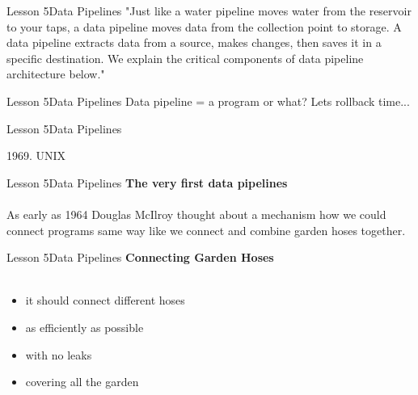 \documentclass[aspectratio=1610]{beamer}
\begin{document}
\begin{frame}{Lesson 5}{Data Pipelines}
\LARGE
"Just like a water pipeline moves water from the reservoir to your
taps, a data pipeline moves data from the collection point to
storage. A data pipeline extracts data from a source, makes changes,
then saves it in a specific destination. We explain the critical
components of data pipeline architecture below."
\end{frame}


\begin{frame}
\end{frame}


\begin{frame}{Lesson 5}{Data Pipelines}
\Huge
 Data pipeline = a program or what? Lets rollback time... 
 \end{frame}


\begin{frame}{Lesson 5}{Data Pipelines}
\Huge
\begin{center}
1969. UNIX 
\end{center}
\end{frame}

\begin{frame}{Lesson 5}{Data Pipelines}
\LARGE
\textbf{The very first data pipelines}\\~\\
As early as 1964 Douglas McIlroy thought about a mechanism how we 
could connect programs same way like we connect and combine
garden hoses together. 
\end{frame}


\begin{frame}
\end{frame}


\begin{frame}
\end{frame}


\begin{frame}
\end{frame}

\begin{frame}{Lesson 5}{Data Pipelines}
\LARGE
\textbf{Connecting Garden Hoses}\\~\\
\begin{itemize}
    \item it should connect different hoses
    \item as efficiently as possible
    \item with no leaks
    \item covering all the garden
\end{itemize}
\end{frame}
\end{document}
